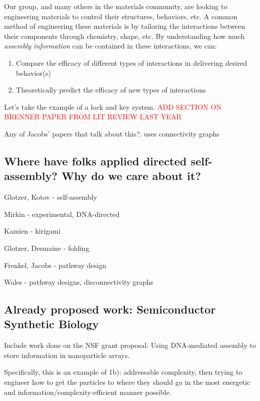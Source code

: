Our group, and many others in the materials community, are looking to engineering materials to control their structures, behaviors, etc.
A common method of engineering these materials is by tailoring the interactions between their components through chemistry, shape, etc.
By understanding how much \textit{assembly information} can be contained in these interactions, we can:
\begin{enumerate}
\item Compare the efficacy of different types of interactions in delivering desired behavior(s)
\item Theoretically predict the efficacy of new types of interactions
\end{enumerate}

Let's take the example of a lock and key system.
\textcolor{red}{ADD SECTION ON BRENNER PAPER FROM LIT REVIEW LAST YEAR}


Any of Jacobs' papers that talk about this?: uses connectivity graphs


\subsection{Where have folks applied directed self-assembly? Why do we care about it?}

Glotzer, Kotov - self-assembly

Mirkin - experimental, DNA-directed

Kamien - kirigami

Glotzer, Desmaine - folding

Frenkel, Jacobs - pathway design

Wales - pathway designs, disconnectivity graphs


\subsection{Already proposed work: Semiconductor Synthetic Biology}

Include work done on the NSF grant proposal: Using DNA-mediated assembly to store information in nanoparticle arrays.

Specifically, this is an example of 1b): addressable complexity, then trying to engineer how to get the particles to where they should go in the most energetic and information/complexity-efficient manner possible.






